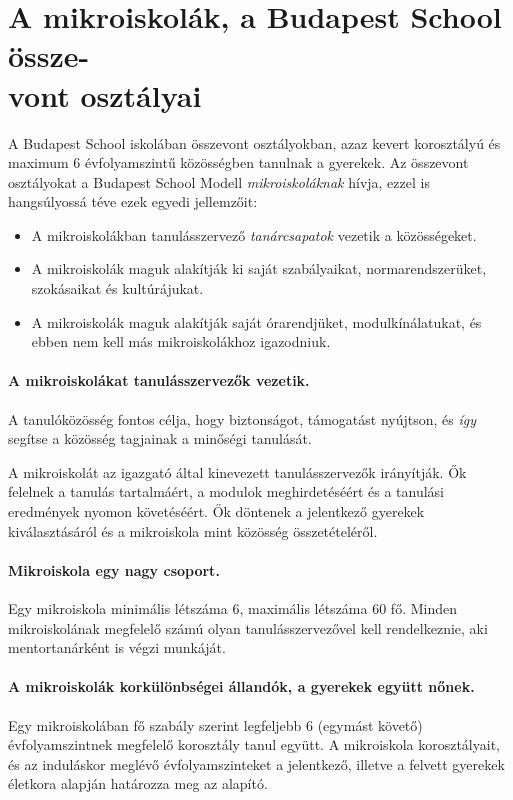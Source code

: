 \section{A mikroiskolák, a Budapest School össze-\\
  vont osztályai}
\label{sec:mikroiskola}

A Budapest School iskolában összevont osztályokban, azaz kevert korosztályú és maximum 6 évfolyamszintű közösségben tanulnak a gyerekek. Az összevont osztályokat a Budapest School Modell \emph{mikroiskoláknak} hívja, ezzel is hangsúlyossá téve ezek egyedi jellemzőit:
\begin{itemize}
      \item A mikroiskolákban  tanulásszervező	\emph{tanárcsapatok} vezetik a közösségeket.
      \item A mikroiskolák maguk alakítják ki saját szabályaikat, normarendszerüket, szokásaikat és kultúrájukat.
      \item A mikroiskolák maguk alakítják saját órarendjüket, modulkínálatukat, és ebben nem kell más mikroiskolákhoz igazodniuk.
\end{itemize}

\paragraph{A mikroiskolákat tanulásszervezők vezetik.}

A tanulóközösség fontos 
célja, hogy biztonságot, támogatást nyújtson, és \emph{így} segítse a közösség tagjainak a minőségi tanulását.

A mikroiskolát az igazgató által kinevezett tanulásszervezők irányítják. Ők felelnek a tanulás tartalmáért, a modulok meghirdetéséért és a tanulási eredmények nyomon követéséért. Ők döntenek a jelentkező gyerekek kiválasztásáról és a mikroiskola mint közösség összetételéről.

\paragraph{Mikroiskola egy nagy csoport.}

Egy mikroiskola minimális létszáma 6, maximális létszáma 60 fő. Minden mikroiskolának megfelelő számú olyan tanulásszervezővel kell rendelkeznie, aki mentortanárként is végzi munkáját.

\paragraph{A mikroiskolák korkülönbségei állandók, a gyerekek együtt nőnek.}
Egy
mikroiskolában fő szabály szerint legfeljebb 6 (egymást követő) évfolyamszintnek megfelelő korosztály tanul együtt. A mikroiskola korosztályait, és az induláskor meglévő évfolyamszinteket a jelentkező, illetve a felvett gyerekek életkora alapján határozza meg az alapító.

